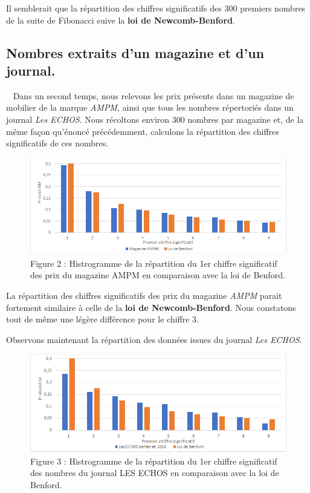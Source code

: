\documentclass[
  12pt,
]{article}
\begin{document}
Il semblerait que la répartition des chiffres significatifs des \(300\)
premiers nombres de la suite de Fibonacci suive la \textbf{loi de
Newcomb-Benford}.

\newpage

\hypertarget{nombres-extraits-dun-magazine-et-dun-journal.}{%
\subsection{Nombres extraits d'un magazine et d'un
journal.}\label{nombres-extraits-dun-magazine-et-dun-journal.}}

~ Dans un second temps, nous relevons les prix présents dans un magazine
de mobilier de la marque \emph{AMPM}, ainsi que tous les nombres
répertoriés dans un journal \emph{Les ECHOS}. Nous récoltons environ
\(300\) nombres par magazine et, de la même façon qu'énoncé
précédemment, calculons la répartition des chiffres significatifs de ces
nombres.

\begin{figure}
\centering
\includegraphics{Images/histogramme_AMPM.png}
\caption{Figure 2 : Histrogramme de la répartition du 1er chiffre
significatif des prix du magazine AMPM en comparaison avec la loi de
Benford.}
\end{figure}

La répartition des chiffres significatifs des prix du magazine
\emph{AMPM} parait fortement similaire à celle de la \textbf{loi de
Newcomb-Benford}. Nous constatons tout de même une légère différence
pour le chiffre \(3\).

Observons maintenant la répartition des données issues du journal
\emph{Les ECHOS}.

\begin{figure}
\centering
\includegraphics{Images/histogramme_journalLESECHOS.png}
\caption{Figure 3 : Histrogramme de la répartition du 1er chiffre
significatif des nombres du journal LES ECHOS en comparaison avec la loi
de Benford.}
\end{figure}
\end{document}
